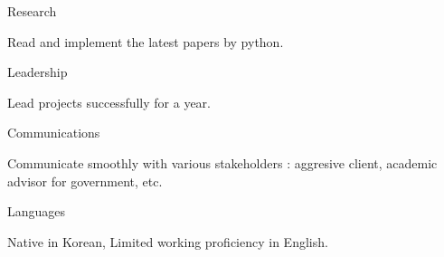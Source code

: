\begin{cvskills}
  \cvskill
    {Research} %
    {
      \begin{skillitems}
      \item {Read and implement the latest papers by python.}
      \end{skillitems}
    }

  \cvskill
    {Leadership} %
    {
      \begin{skillitems}
      \item {Lead projects successfully for a year.}
      \end{skillitems}
    }

  \cvskill
    {Communications} %
    {
      \begin{skillitems}
        \item {Communicate smoothly with various stakeholders : aggresive client, academic advisor for government, etc.}
      \end{skillitems}
    }

  \cvskill
    {Languages} %
    {
      \begin{skillitems}
        \item {Native in Korean, Limited working proficiency in English.}
      \end{skillitems}
    }

\end{cvskills}
